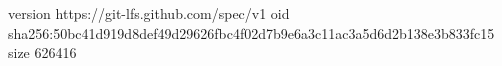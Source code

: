 version https://git-lfs.github.com/spec/v1
oid sha256:50bc41d919d8def49d29626fbc4f02d7b9e6a3c11ac3a5d6d2b138e3b833fc15
size 626416

